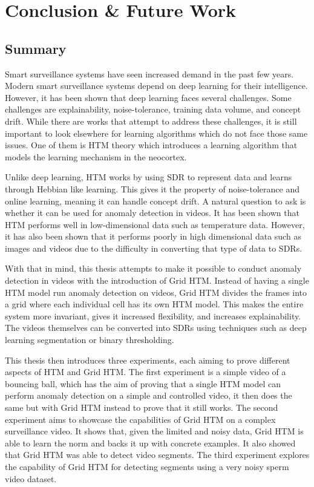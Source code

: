 \chapter{Conclusion \& Future Work}
\label{sec:conclusion}
\section{Summary}
Smart surveillance systems have seen increased demand in the past few years. Modern smart surveillance systems depend on deep learning for their intelligence. However, it has been shown that deep learning faces several challenges. Some challenges are explainability, noise-tolerance, training data volume, and concept drift. While there are works that attempt to address these challenges, it is still important to look elsewhere for learning algorithms which do not face those same issues. One of them is HTM theory which introduces a learning algorithm that models the learning mechanism in the neocortex.
\par
Unlike deep learning, HTM works by using SDR to represent data and learns through Hebbian like learning. This gives it the property of noise-tolerance and online learning, meaning it can handle concept drift. A natural question to ask is whether it can be used for anomaly detection in videos. It has been shown that HTM performs well in low-dimensional data such as temperature data. However, it has also been shown that it performs poorly in high dimensional data such as images and videos due to the difficulty in converting that type of data to SDRs.
\par
With that in mind, this thesis attempts to make it possible to conduct anomaly detection in videos with the introduction of Grid HTM. Instead of having a single HTM model run anomaly detection on videos, Grid HTM divides the frames into a grid where each individual cell has its own HTM model. This makes the entire system more invariant, gives it increased flexibility, and increases explainability. The videos themselves can be converted into SDRs using techniques such as deep learning segmentation or binary thresholding.
\par
This thesis then introduces three experiments, each aiming to prove different aspects of HTM and Grid HTM. The first experiment is a simple video of a bouncing ball, which has the aim of proving that a single HTM model can perform anomaly detection on a simple and controlled video, it then does the same but with Grid HTM instead to prove that it still works. The second experiment aims to showcase the capabilities of Grid HTM on a complex surveillance video. It shows that, given the limited and noisy data, Grid HTM is able to learn the norm and backs it up with concrete examples. It also showed that Grid HTM was able to detect video segments. The third experiment explores the capability of Grid HTM for detecting segments using a very noisy sperm video dataset.
